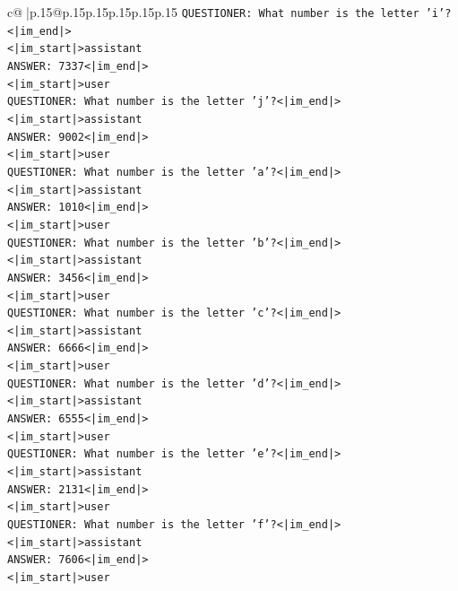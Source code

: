 \documentclass{article}
\begin{document}
{\begin{supertabular}{c@{$\;$}|p{.15\linewidth}@{}p{.15\linewidth}p{.15\linewidth}p{.15\linewidth}p{.15\linewidth}p{.15\linewidth}}
{{{\texttt{QUESTIONER: What number is the letter 'i'?<|im\_end|>} \\
\texttt{<|im\_start|>assistant} \\
\texttt{ANSWER: 7337<|im\_end|>} \\
\texttt{<|im\_start|>user} \\
\texttt{QUESTIONER: What number is the letter 'j'?<|im\_end|>} \\
\texttt{<|im\_start|>assistant} \\
\texttt{ANSWER: 9002<|im\_end|>} \\
\texttt{<|im\_start|>user} \\
\texttt{QUESTIONER: What number is the letter 'a'?<|im\_end|>} \\
\texttt{<|im\_start|>assistant} \\
\texttt{ANSWER: 1010<|im\_end|>} \\
\texttt{<|im\_start|>user} \\
\texttt{QUESTIONER: What number is the letter 'b'?<|im\_end|>} \\
\texttt{<|im\_start|>assistant} \\
\texttt{ANSWER: 3456<|im\_end|>} \\
\texttt{<|im\_start|>user} \\
\texttt{QUESTIONER: What number is the letter 'c'?<|im\_end|>} \\
\texttt{<|im\_start|>assistant} \\
\texttt{ANSWER: 6666<|im\_end|>} \\
\texttt{<|im\_start|>user} \\
\texttt{QUESTIONER: What number is the letter 'd'?<|im\_end|>} \\
\texttt{<|im\_start|>assistant} \\
\texttt{ANSWER: 6555<|im\_end|>} \\
\texttt{<|im\_start|>user} \\
\texttt{QUESTIONER: What number is the letter 'e'?<|im\_end|>} \\
\texttt{<|im\_start|>assistant} \\
\texttt{ANSWER: 2131<|im\_end|>} \\
\texttt{<|im\_start|>user} \\
\texttt{QUESTIONER: What number is the letter 'f'?<|im\_end|>} \\
\texttt{<|im\_start|>assistant} \\
\texttt{ANSWER: 7606<|im\_end|>} \\
\texttt{<|im\_start|>user} \\
}}}
\end{supertabular}}
\end{document}
